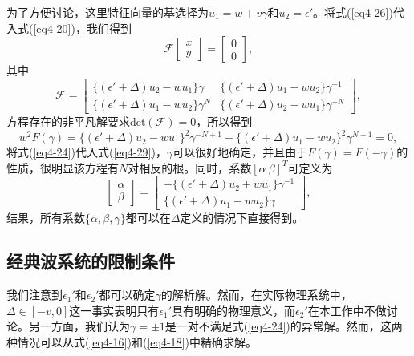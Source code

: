 为了方便讨论，这里特征向量的基选择为\(u_{1}=w + v\gamma\)和\(u_{2}=\epsilon'\)。将式(\ref{eq4-26})代入式(\ref{eq4-20})，我们得到
\begin{equation}\label{eq4-27}
    \mathcal{F}\begin{bmatrix}x\\y\end{bmatrix}=\begin{bmatrix}0\\0\end{bmatrix},
\end{equation}
其中
\begin{equation}\label{eq4-28}
    \mathcal{F}=\begin{bmatrix}\{(\epsilon'+\Delta)u_{2}-wu_{1}\}\gamma&\{(\epsilon'+\Delta)u_{1}-wu_{2}\}\gamma^{-1}\\\{(\epsilon'+\Delta)u_{1}-wu_{2}\}\gamma^{N}&\{(\epsilon'+\Delta)u_{2}-wu_{1}\}\gamma^{-N}\end{bmatrix},
\end{equation}
方程存在的非平凡解要求\(\mathrm{det}(\mathcal{F}) = 0\)，所以得到
\begin{equation}\label{eq4-29}
    w^{2}F(\gamma)=\{(\epsilon'+\Delta)u_{2}-wu_{1}\}^{2}\gamma^{-N + 1}-\{(\epsilon'+\Delta)u_{1}-wu_{2}\}^{2}\gamma^{N - 1}=0,
\end{equation}
将式(\ref{eq4-24})代入式(\ref{eq4-29})，\(\gamma\)可以很好地确定，并且由于\(F(\gamma)=F(-\gamma)\)的性质，很明显该方程有\(N\)对相反的根。同时，系数\([\alpha\ \beta]^{T}\)可定义为
\begin{equation}\label{eq4-30}
    \begin{bmatrix}\alpha\\\beta\end{bmatrix}=\begin{bmatrix}-\{(\epsilon'+\Delta)u_{2}+wu_{1}\}\gamma^{-1}\\\{(\epsilon'+\Delta)u_{1}-wu_{2}\}\gamma\end{bmatrix},
\end{equation}
结果，所有系数\(\{\alpha,\beta,\gamma\}\)都可以在\(\Delta\)定义的情况下直接得到。

\subsection{经典波系统的限制条件}

我们注意到\(\epsilon_{1}'\)和\(\epsilon_{2}'\)都可以确定\(\gamma\)的解析解。然而，在实际物理系统中，\(\Delta\in[-v,0]\)这一事实表明只有\(\epsilon_{1}'\)具有明确的物理意义，而\(\epsilon_{2}'\)在本工作中不做讨论。另一方面，我们认为\(\gamma=\pm1\)是一对不满足式(\ref{eq4-24})的异常解。然而，这两种情况可以从式(\ref{eq4-16})和(\ref{eq4-18})中精确求解。

